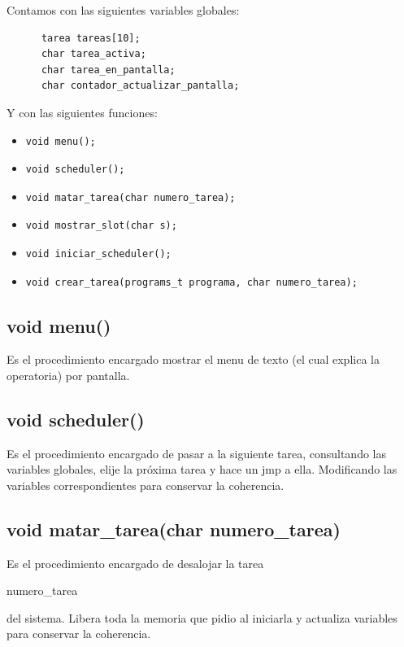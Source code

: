 \documentclass[a4paper,10pt]{article}
\begin{document}
Contamos con las siguientes variables globales:

\begin{verbatim}
      tarea tareas[10];
      char tarea_activa;	
      char tarea_en_pantalla;
      char contador_actualizar_pantalla;
\end{verbatim}


Y con las siguientes funciones:

\begin{itemize}
\item \begin{verbatim}void menu(); \end{verbatim}
\item \begin{verbatim}void scheduler();\end{verbatim}
\item \begin{verbatim}void matar_tarea(char numero_tarea);\end{verbatim}
\item \begin{verbatim}void mostrar_slot(char s);\end{verbatim}
\item \begin{verbatim}void iniciar_scheduler();\end{verbatim}
\item \begin{verbatim}void crear_tarea(programs_t programa, char numero_tarea);\end{verbatim}
\end{itemize}

\subsection*{ void menu()}
Es el procedimiento encargado mostrar el menu de texto (el cual explica la operatoria) por pantalla.

\subsection*{ void scheduler()}
Es el procedimiento encargado de pasar a la siguiente tarea, consultando las variables globales, elije la próxima tarea y hace un jmp a ella. Modificando las variables correspondientes para conservar la coherencia.

\subsection*{ void matar\_tarea(char numero\_tarea) }
Es el procedimiento encargado de desalojar la tarea \begin{it}numero\_tarea\end{it} del sistema. Libera toda la memoria que pidio al iniciarla y actualiza variables para conservar la coherencia.
\end{document}
